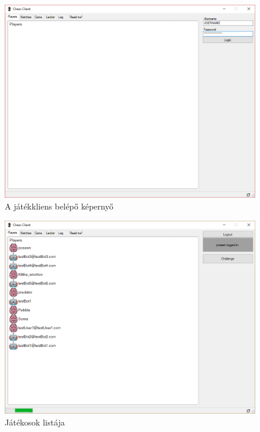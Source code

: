\documentclass[twoside, a4paper, 12pt]{article}
\begin{document}
\begin{figure}[htbp]
	\centering
	\includegraphics[width=1\textwidth]{img/humanClientLogin.png}
	\caption{A játékkliens belépő képernyő}
	\label{fig:humanClientLogin}
\end{figure}

\begin{figure}[htbp]
	\centering
	\includegraphics[width=1\textwidth]{img/humanClientPlayers.png}
	\caption{Játékosok listája}
	\label{fig:humanClientPlayers}
\end{figure}
\end{document}
